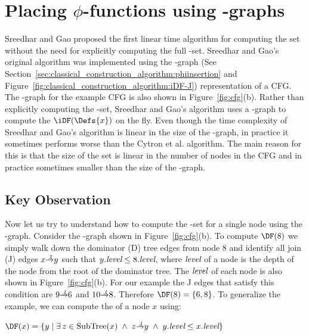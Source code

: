 {\section{Placing $\phi$-functions using \DJ-graphs}
Sreedhar and Gao proposed the first linear time algorithm for computing the \iDF set without the need for explicitly computing the full \DF-set. Sreedhar and Gao's original algorithm was implemented using the \DJ-graph (See Section~\ref{sec:classical_construction_algorithm:phiinsertion} and Figure~\ref{fig:classical_construction_algorithm:iDF-J}) representation of a CFG. 
The \DJ-graph for the example CFG is also shown in Figure~\ref{fig:cfg}(b). Rather than explicitly computing the \DF-set, Sreedhar and Gao's algorithm uses a \DJ-graph to compute the  $\iDF(\Defs{x})$ on the fly. Even though the time complexity of Sreedhar and Gao's algorithm is linear in the size of the \DJ-graph, in practice it sometimes performs worse than the Cytron et al. algorithm. The main reason for this is that the size of the \DF set is linear in the number of nodes in the CFG 
and in practice sometimes smaller than the size of the \DJ-graph. 


\subsection{Key Observation} 
 
Now let us try to understand how to compute the \DF-set for a single node using the \DJ-graph. 
Consider  the \DJ-graph shown in Figure~\ref{fig:cfg}(b). To compute $\DF(8)$ we simply walk down the
dominator (D) tree edges from node 8 and identify all join (J) edges $x \st{J} y$ such
that $y.\textit{level} \leq 8.\textit{level}$, where $\textit{level}$ of a node is the depth of the node from the
root of the dominator tree. The $\textit{level}$ of each node is also shown in Figure~\ref{fig:cfg}(b).
For our example the J edges that satisfy this 
condition are $9 \st{J} 6$ and $10 \st{J} 8$. Therefore $\DF(8) = \{6, 8\}$. To generalize the example, we can
compute the \DF of a node $x$ using:
\begin{center}
  $\DF(x) = \{y\mid\exists\, z \in {\rm SubTree}(x) \; \wedge \; z \st{J} y \; 
  \wedge \; y.\level \leq x.\level \}$
\end{center}

}

